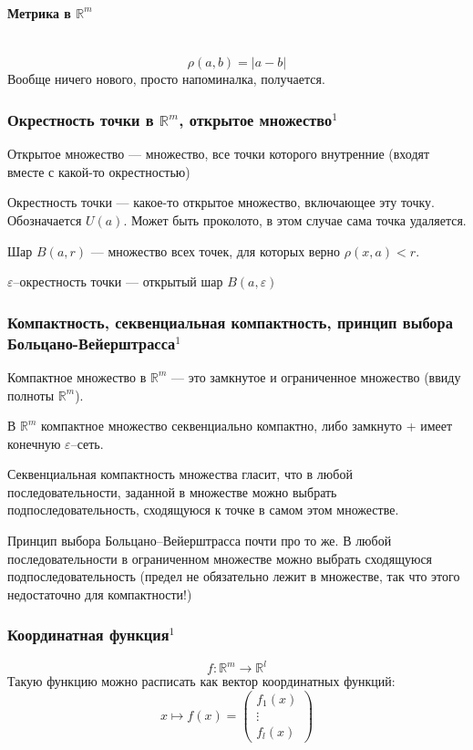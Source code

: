 \documentclass{article}
\let\vanillaparagraph\paragraph
\renewcommand{\paragraph}[1]{\vanillaparagraph{#1}\mbox{}\\}
\begin{document}
\paragraph{Метрика в \texorpdfstring{$\mathbb{R}^m$}{R\^m}}
$$
\rho(a, b) = |a - b|
$$
Вообще ничего нового, просто напоминалка, получается. 

\subsubsection{Окрестность точки в \texorpdfstring{$\mathbb{R}^m$}{R\^m}, открытое множество\texorpdfstring{$^1$}{}}
Открытое множество --- множество, все точки которого внутренние (входят вместе с какой-то окрестностью)

Окрестность точки --- какое-то открытое множество, включающее эту точку. Обозначается $U(a)$. Может быть проколото, в этом случае сама точка удаляется. 

Шар $B(a, r)$ --- множество всех точек, для которых верно $\rho(x, a) < r$.

$\varepsilon$--окрестность точки --- открытый шар $B(a, \varepsilon)$

\subsubsection{Компактность, секвенциальная компактность, принцип выбора Больцано-Вейерштрасса\texorpdfstring{$^1$}{}}
Компактное множество в $\mathbb{R}^m$ --- это замкнутое и ограниченное множество (ввиду полноты $\mathbb{R}^m$).

В $\mathbb{R}^m$ компактное множество секвенциально компактно, либо замкнуто + имеет конечную $\varepsilon$--сеть.

Секвенциальная компактность множества гласит, что в любой последовательности, заданной в множестве можно выбрать подпоследовательность, сходящуюся к точке в самом этом множестве.

Принцип выбора Больцано--Вейерштрасса почти про то же. В любой последовательности в ограниченном множестве можно выбрать сходящуюся подпоследовательность (предел не обязательно лежит в множестве, так что этого недостаточно для компактности!)

\subsubsection{Координатная функция\texorpdfstring{$^1$}{}}
$$
f: \mathbb{R}^m \rightarrow \mathbb{R}^l
$$
Такую функцию можно расписать как вектор координатных функций:
$$
x \mapsto f(x) = \left(\begin{array}{c}
     f_1(x) \\
     \vdots \\
     f_l(x)
\end{array} \right)
$$
\end{document}
